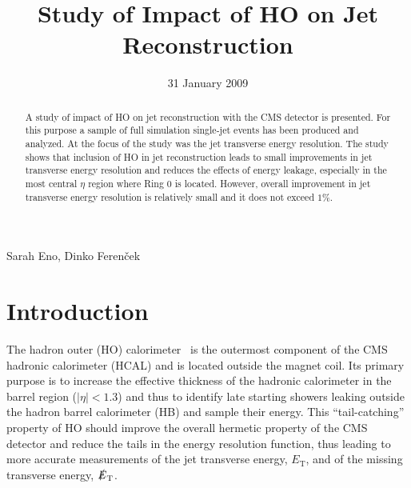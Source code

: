 \documentclass{cmspaper}
\begin{document}

\begin{titlepage}

\date{31 January 2009}

\title{Study of Impact of HO on Jet Reconstruction}

\begin{Authlist}
  Sarah Eno, Dinko Ferenček
\end{Authlist}


\begin{abstract}
A study of impact of HO on jet reconstruction with the CMS detector is presented. For this purpose a sample of full simulation single-jet events has been produced and analyzed. At the focus of the study was the jet transverse energy resolution. The study shows that inclusion of HO in jet reconstruction leads to small improvements in jet transverse energy resolution and reduces the effects of energy leakage, especially in the most central $\eta$ region where Ring $0$ is located. However, overall improvement in jet transverse energy resolution is relatively small and it does not exceed $1\%$. 
\end{abstract} 

  
\end{titlepage}

\setcounter{page}{2}%


\section{Introduction}

The hadron outer (HO) calorimeter~\cite{ref:cms-jinst} is the outermost component of the CMS hadronic calorimeter (HCAL) and is located outside the magnet coil. Its primary purpose is to increase the effective thickness of the hadronic calorimeter in the barrel region ($|\eta|<1.3$) and thus to identify late starting showers leaking outside the hadron barrel calorimeter (HB) and sample their energy. This ``tail-catching'' property of HO should improve the overall hermetic property of the CMS detector and reduce the tails in the energy resolution function, thus leading to more accurate measurements of the jet transverse energy, $E_\text{T}$, and of the missing transverse energy, $\slashed E_\text{T}$.
\end{document}

